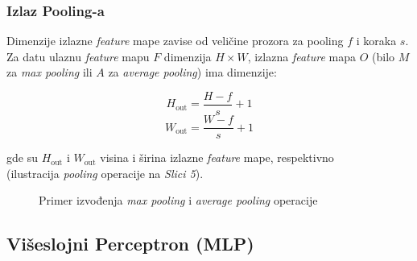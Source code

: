 \documentclass[12pt]{article}
\begin{document}
   \newpage
   \subsubsection*{Izlaz Pooling-a}

   Dimenzije izlazne \textit{feature} mape zavise od veličine prozora za pooling \( f \) i koraka \( s \). 
   Za datu ulaznu \textit{feature} mapu \( F \) dimenzija \( H \times W \), izlazna \textit{feature} mapa \( O \) 
   (bilo \( M \) za \textit{max pooling} ili \( A \) za \textit{average pooling}) ima dimenzije:
   
   \[
   H_{\text{out}} = \frac{H - f}{s} + 1
   \]
   \[
   W_{\text{out}} = \frac{W - f}{s} + 1
   \]
   
   gde su \( H_{\text{out}} \) i \( W_{\text{out}} \) visina i širina izlazne \textit{feature} mape, respektivno \\ (ilustracija \textit{pooling} operacije na \textit{Slici 5}).
   
   
   \begin{figure}[h!]
      \centering
      \vspace{0.5cm} %
      \caption{Primer izvođenja \textit{max pooling} i \textit{average pooling} operacije}
      \label{fig:max_avg_pooling}
    \end{figure}

    \newpage
   \subsection*{Višeslojni Perceptron (MLP)}
\end{document}
